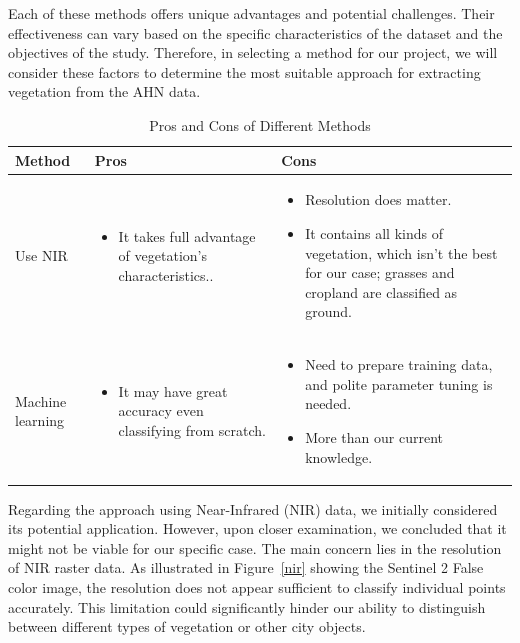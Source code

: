 \documentclass{article}
\begin{document}
\noindent Each of these methods offers unique advantages and potential challenges. Their effectiveness can vary based on the specific characteristics of the dataset and the objectives of the study. Therefore, in selecting a method for our project, we will consider these factors to determine the most suitable approach for extracting vegetation from the AHN data.\\


\begin{table}[H]
  \centering
  \small
  \caption{Pros and Cons of Different Methods}
  \label{table:methods-pros-cons}
  \renewcommand{\arraystretch}{1.5}  
  \begin{tabular}{|l|p{5cm}|p{5cm}|}
    \hline
    \textbf{Method} & \textbf{Pros} & \textbf{Cons} \\
    \hline
    Use NIR & 
    \begin{itemize}
      \item It takes full advantage of vegetation’s characteristics..
    \end{itemize} & 
    \begin{itemize}
      \item Resolution does matter.
      \item It contains all kinds of vegetation, which isn’t the best for our case; grasses and cropland are classified as ground.
    \end{itemize} \\
    \hline
    Machine learning & 
    \begin{itemize}
      \item It may have great accuracy even classifying from scratch.
    \end{itemize} & 
    \begin{itemize}
      \item Need to prepare training data, and polite parameter tuning is needed.
      \item More than our current knowledge.
    \end{itemize} \\
    \hline
  \end{tabular}
\end{table}

\noindent Regarding the approach using Near-Infrared (NIR) data, we initially considered its potential application. However, upon closer examination, we concluded that it might not be viable for our specific case. The main concern lies in the resolution of NIR raster data. As illustrated in Figure~\ref{nir} showing the Sentinel 2 False color image, the resolution does not appear sufficient to classify individual points accurately. This limitation could significantly hinder our ability to distinguish between different types of vegetation or other city objects.\\
\end{document}
